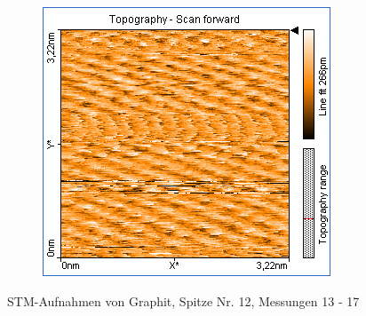\begin{figure}
\begin{subfigure}[b]{\picwidth}
        \caption{}
        \label{fig:graphit_06_16}
    \end{subfigure}
    \begin{subfigure}[b]{\picwidth}
        \includegraphics[width=\textwidth]{data/Graphit/pic_06_17_3nm_set_point_2nA}
        \caption{}
        \label{fig:graphit_06_17}
    \end{subfigure}
    \caption{STM-Aufnahmen von Graphit, Spitze Nr. 12, Messungen 13 - 17}\label{fig:graphit_06}
\end{figure}


